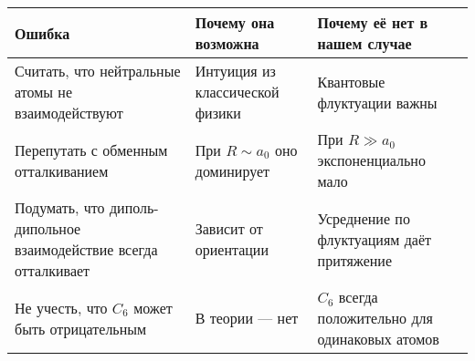 \documentclass[11pt]{article}
\begin{document}
\begin{longtable}[]{@{}lll@{}}
\toprule
\begin{minipage}[b]{0.10\columnwidth}\raggedright\strut
Ошибка\strut
\end{minipage} & \begin{minipage}[b]{0.32\columnwidth}\raggedright\strut
Почему она возможна\strut
\end{minipage} & \begin{minipage}[b]{0.41\columnwidth}\raggedright\strut
Почему её нет в нашем случае\strut
\end{minipage}\tabularnewline
\midrule
\endhead
\begin{minipage}[t]{0.10\columnwidth}\raggedright\strut
Считать, что нейтральные атомы не взаимодействуют\strut
\end{minipage} & \begin{minipage}[t]{0.32\columnwidth}\raggedright\strut
Интуиция из классической физики\strut
\end{minipage} & \begin{minipage}[t]{0.41\columnwidth}\raggedright\strut
Квантовые флуктуации важны\strut
\end{minipage}\tabularnewline
\begin{minipage}[t]{0.10\columnwidth}\raggedright\strut
Перепутать с обменным отталкиванием\strut
\end{minipage} & \begin{minipage}[t]{0.32\columnwidth}\raggedright\strut
При \(R \sim a_0\) оно доминирует\strut
\end{minipage} & \begin{minipage}[t]{0.41\columnwidth}\raggedright\strut
При \(R \gg a_0\) экспоненциально мало\strut
\end{minipage}\tabularnewline
\begin{minipage}[t]{0.10\columnwidth}\raggedright\strut
Подумать, что диполь-дипольное взаимодействие всегда отталкивает\strut
\end{minipage} & \begin{minipage}[t]{0.32\columnwidth}\raggedright\strut
Зависит от ориентации\strut
\end{minipage} & \begin{minipage}[t]{0.41\columnwidth}\raggedright\strut
Усреднение по флуктуациям даёт притяжение\strut
\end{minipage}\tabularnewline
\begin{minipage}[t]{0.10\columnwidth}\raggedright\strut
Не учесть, что \(C_6\) может быть отрицательным\strut
\end{minipage} & \begin{minipage}[t]{0.32\columnwidth}\raggedright\strut
В теории --- нет\strut
\end{minipage} & \begin{minipage}[t]{0.41\columnwidth}\raggedright\strut
\(C_6\) всегда положительно для одинаковых атомов\strut
\end{minipage}\tabularnewline
\bottomrule
\end{longtable}
\end{document}
